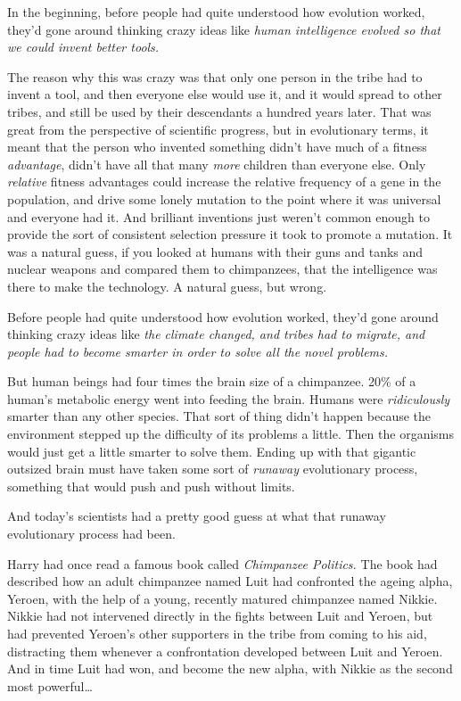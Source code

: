 In the beginning, before people had quite understood how evolution worked, they’d gone around thinking crazy ideas like \emph{human intelligence evolved so that we could invent better tools.}

The reason why this was crazy was that only one person in the tribe had to invent a tool, and then everyone else would use it, and it would spread to other tribes, and still be used by their descendants a hundred years later. That was great from the perspective of scientific progress, but in evolutionary terms, it meant that the person who invented something didn’t have much of a fitness \emph{advantage}, didn’t have all that many \emph{more} children than everyone else. Only \emph{relative} fitness advantages could increase the relative frequency of a gene in the population, and drive some lonely mutation to the point where it was universal and everyone had it. And brilliant inventions just weren’t common enough to provide the sort of consistent selection pressure it took to promote a mutation. It was a natural guess, if you looked at humans with their guns and tanks and nuclear weapons and compared them to chimpanzees, that the intelligence was there to make the technology. A natural guess, but wrong.

Before people had quite understood how evolution worked, they’d gone around thinking crazy ideas like \emph{the climate changed, and tribes had to migrate, and people had to become smarter in order to solve all the novel problems.}

But human beings had four times the brain size of a chimpanzee. 20\% of a human’s metabolic energy went into feeding the brain. Humans were \emph{ridiculously} smarter than any other species. That sort of thing didn’t happen because the environment stepped up the difficulty of its problems a little. Then the organisms would just get a little smarter to solve them. Ending up with that gigantic outsized brain must have taken some sort of \emph{runaway} evolutionary process, something that would push and push without limits.

And today’s scientists had a pretty good guess at what that runaway evolutionary process had been.

Harry had once read a famous book called \emph{Chimpanzee Politics.} The book had described how an adult chimpanzee named Luit had confronted the ageing alpha, Yeroen, with the help of a young, recently matured chimpanzee named Nikkie. Nikkie had not intervened directly in the fights between Luit and Yeroen, but had prevented Yeroen’s other supporters in the tribe from coming to his aid, distracting them whenever a confrontation developed between Luit and Yeroen. And in time Luit had won, and become the new alpha, with Nikkie as the second most powerful…

